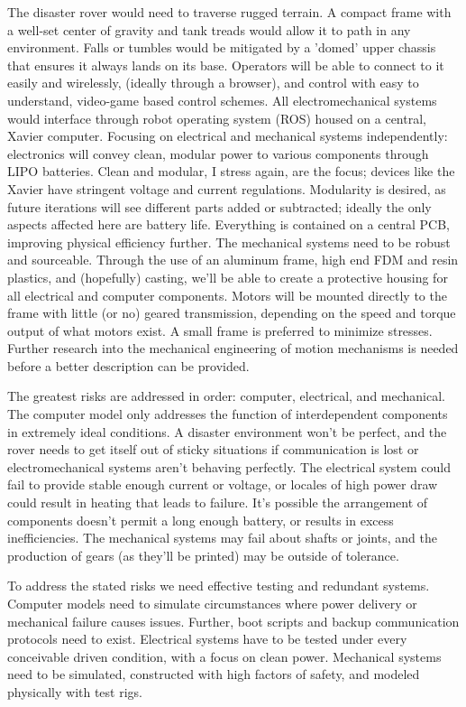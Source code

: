 \documentclass[a4paper, 10pt]{article}
\begin{document}
	The disaster rover would need to traverse rugged terrain. A compact frame with a well-set center of gravity and tank treads would allow it to path in any environment. Falls or tumbles would be mitigated by a 'domed' upper chassis that ensures it always lands on its base. Operators will be able to connect to it easily and wirelessly, (ideally through a browser), and control with easy to understand, video-game based control schemes. All electromechanical systems would interface through robot operating system (ROS) housed on a central, Xavier computer. Focusing on electrical and mechanical systems independently: electronics will convey clean, modular power to various components through LIPO batteries. Clean and modular, I stress again, are the focus; devices like the Xavier have stringent voltage and current regulations. Modularity is desired, as future iterations will see different parts added or subtracted; ideally the only aspects affected here are battery life. Everything is contained on a central PCB, improving physical efficiency further. The mechanical systems need to be robust and sourceable. Through the use of an aluminum frame, high end FDM and resin plastics, and (hopefully) casting, we'll be able to create a protective housing for all electrical and computer components. Motors will be mounted directly to the frame with little (or no) geared transmission, depending on the speed and torque output of what motors exist. A small frame is preferred to minimize stresses. Further research into the mechanical engineering of motion mechanisms is needed before a better description can be provided.
	
	The greatest risks are addressed in order: computer, electrical, and mechanical. The computer model only addresses the function of interdependent components in extremely ideal conditions. A disaster environment won't be perfect, and the rover needs to get itself out of sticky situations if communication is lost or electromechanical systems aren't behaving perfectly. The electrical system could fail to provide stable enough current or voltage, or locales of high power draw could result in heating that leads to failure. It's possible the arrangement of components doesn't permit a long enough battery, or results in excess inefficiencies. The mechanical systems may fail about shafts or joints, and the production of gears (as they'll be printed) may be outside of tolerance.
	
	To address the stated risks we need effective testing and redundant systems. Computer models need to simulate circumstances where power delivery or mechanical failure causes issues. Further, boot scripts and backup communication protocols need to exist. Electrical systems have to be tested under every conceivable driven condition, with a focus on clean power. Mechanical systems need to be simulated, constructed with high factors of safety, and modeled physically with test rigs.
 	
\end{document}
